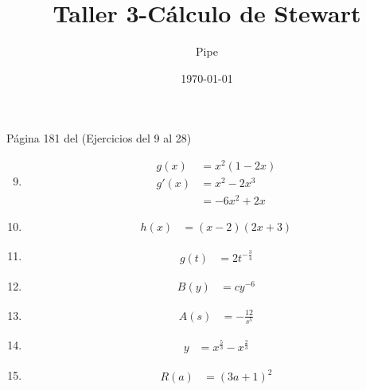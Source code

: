 \documentclass{article}
\title{Taller 3-Cálculo de Stewart}
\date{\today}
\author{Pipe}
\begin{document}
\maketitle
Página 181 del (Ejercicios del 9 al 28)
\begin{enumerate}
    \setcounter{enumi}{8}
  \item
    \begin{equation*}
      \begin{split}
        g(x) &= x^2 (1-2x) \\
        g'(x) &= x^2-2x^3 \\
        &= -6x^2+2x
      \end{split}
    \end{equation*}
  \item 
    \begin{equation*}
      \begin{split}
        h(x) & = (x-2)(2x+3)
      \end{split}
    \end{equation*}
  \item 
    \begin{equation*}
      \begin{split}
        g(t) & = 2t^{-\frac{3}{4}}
      \end{split}
    \end{equation*}
  \item 
    \begin{equation*}
      \begin{split}
        B(y) &= cy^{-6}
      \end{split}
    \end{equation*}
  \item 
    \begin{equation*}
      \begin{split}
        A(s) &= -\frac{12}{s^5}
      \end{split}
    \end{equation*}
  \item 
    \begin{equation*}
      \begin{split}
        y &= x^\frac{5}{3}-x^\frac{2}{3}
      \end{split}
    \end{equation*}
  \item 
    \begin{equation*}
      \begin{split}
        R(a) &= (3a+1)^2
      \end{split}

\end{equation*}
\end{enumerate}
\end{document}
